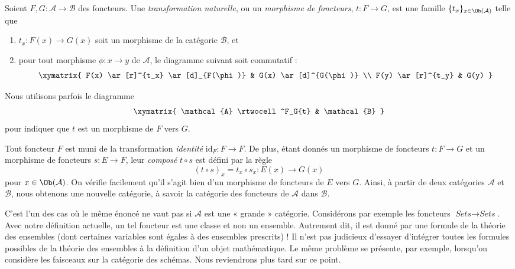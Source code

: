 \begin{definition}
\label{definition-transformation-functors}
Soient $F, G : \mathcal{A} \to \mathcal{B}$ des foncteurs.
Une {\it transformation naturelle}, ou un {\it morphisme de foncteurs},
$t : F \to G$, est une famille $\{t_x\}_{x\in \Ob(\mathcal{A})}$
telle que
\begin{enumerate}
\item $t_x : F(x) \to G(x)$ soit un morphisme de la catégorie $\mathcal{B}$, et
\item pour tout morphisme $\phi : x \to y$ de $\mathcal{A}$, le diagramme
suivant soit commutatif :
$$
\xymatrix{
F(x) \ar[r]^{t_x} \ar[d]_{F(\phi)} & G(x) \ar[d]^{G(\phi)} \\
F(y) \ar[r]^{t_y} & G(y) }
$$
\end{enumerate}
\end{definition}

\noindent
Nous utilisons parfois le diagramme
$$
\xymatrix{
\mathcal{A}
\rtwocell^F_G{t}
&
\mathcal{B}
}
$$
pour indiquer que $t$ est un morphisme de $F$ vers $G$.

\medskip\noindent
Tout foncteur $F$ est muni de la transformation
{\it identité} $\text{id}_F : F \to F$. De plus, étant donnés un morphisme de
foncteurs $t : F \to G$ et un morphisme de foncteurs $s : E \to F$,
leur {\it composé} $t \circ s$ est défini par la règle
$$
(t \circ s)_x = t_x \circ s_x : E(x) \to G(x)
$$
pour $x \in \Ob(\mathcal{A})$.
On vérifie facilement qu'il s'agit bien d'un morphisme de foncteurs
de $E$ vers $G$.
Ainsi, à partir de deux catégories
$\mathcal{A}$ et $\mathcal{B}$, nous obtenons une nouvelle catégorie,
à savoir la catégorie des foncteurs de $\mathcal{A}$ dans $\mathcal{B}$.

\begin{remark}
\label{remark-functors-sets-sets}
C'est l'un des cas où le même énoncé ne vaut pas si
$\mathcal{A}$ est une « grande » catégorie. Considérons par exemple les
foncteurs $\textit{Sets} \to \textit{Sets}$. Avec notre définition actuelle,
un tel foncteur est une classe et non un ensemble. Autrement dit, il est
donné par une formule de la théorie des ensembles (dont certaines variables
sont égales à des ensembles prescrits) ! Il n'est pas judicieux d'essayer
d'intégrer toutes les formules possibles de la théorie des ensembles à la
définition d'un objet mathématique. Le même problème se présente, par exemple,
lorsqu'on considère les faisceaux sur la catégorie des schémas.
Nous reviendrons plus tard sur ce point.
\end{remark}

